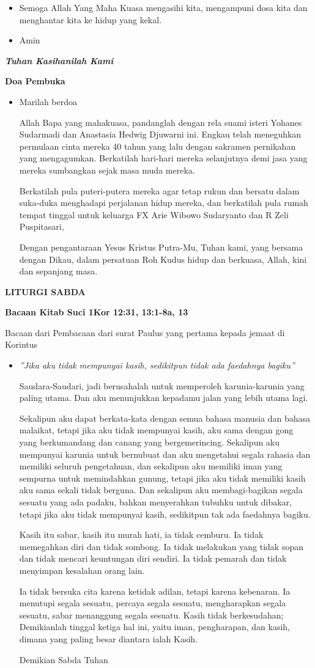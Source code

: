 \documentclass[12pt,twoside,anypage]{scrbook}
\makeatletter
\newcommand{\judul}[1]{%
  {\parindent \z@ \centering \normalfont
    \interlinepenalty\@M \large \bfseries #1\par\nobreak \vskip 20\p@ }}
\newcommand{\subjudul}[1]{%
  {\parindent \z@ \normalfont
    \interlinepenalty\@M \bfseries #1\par\nobreak \vskip 20\p@ }}
\newcommand{\lagu}[1]{%
  {\parindent \z@ \normalfont
    \interlinepenalty\@M \bfseries \emph{#1}\par\nobreak \vskip 20\p@ }}
\newcommand{\BU}[1]{\begin{itemize} \item[U:] #1 \end{itemize}}
\newcommand{\BI}[1]{\begin{itemize} \item[I:] #1 \end{itemize}}
\newcommand{\BP}[1]{\begin{itemize} \item[P:] #1 \end{itemize}}
\newcommand{\keluarga}{FX Arie Wibowo Sudaryanto dan R Zeli Puspitasari\xspace}
\newcommand{\ibu}{Anastasia Hedwig Djuwarni\xspace}
\newcommand{\bapak}{Yohanes Sudarmadi\xspace}
\makeatother
\begin{document}
\BI{Semoga Allah Yang Maha Kuasa mengasihi kita, mengampuni dosa kita dan menghantar kita ke hidup yang kekal.}

\BU{Amin}

\lagu{Tuhan Kasihanilah Kami}

\subjudul{Doa Pembuka}

\BI{Marilah berdoa

Allah Bapa yang mahakuasa, pandanglah dengan rela suami isteri \bapak
dan \ibu ini. Engkau telah meneguhkan permulaan cinta mereka 40 tahun yang lalu dengan sakramen pernikahan yang mengagumkan. Berkatilah hari-hari mereka selanjutnya demi jasa yang mereka sumbangkan sejak masa muda mereka. 

Berkatilah pula puteri-putera
mereka agar tetap rukun dan bersatu dalam
suka-duka menghadapi perjalanan hidup mereka,
dan berkatilah pula rumah tempat tinggal untuk keluarga \keluarga ,

Dengan pengantaraan Yesus Kristus Putra-Mu,
Tuhan kami,
yang bersama dengan Dikau,
dalam persatuan Roh Kudus
hidup dan berkuasa,
Allah, kini dan sepanjang masa.
}

\judul{LITURGI SABDA}

\subjudul{Bacaan Kitab Suci 1Kor 12:31, 13:1-8a, 13}

Bacaan dari Pembacaan dari surat Paulus yang pertama kepada
jemaat di Korintus

\BP{
\begin{center}\emph{
”Jika aku tidak mempunyai kasih, sedikitpun tidak ada
faedahnya bagiku”}
\end{center}
 
Saudara-Saudari, jadi berusahalah untuk memperoleh
karunia-karunia yang paling utama. Dan aku menunjukkan
kepadamu jalan yang lebih utama lagi.

Sekalipun aku dapat berkata-kata dengan semua
bahasa manusia dan bahasa malaikat, tetapi jika aku tidak
mempunyai kasih, aku sama dengan gong yang
berkumandang dan canang yang bergemerincing.
Sekalipun aku mempunyai karunia untuk bernubuat dan
aku mengetahui segala rahasia dan memiliki seluruh
pengetahuan, dan sekalipun aku memiliki iman yang
sempurna untuk memindahkan gunung, tetapi jika aku
tidak memiliki kasih aku sama sekali tidak berguna.
Dan sekalipun aku membagi-bagikan segala sesuatu
yang ada padaku, bahkan menyerahkan tubuhku untuk
dibakar, tetapi jika aku tidak mempunyai kasih, sedikitpun
tak ada faedahnya bagiku.

Kasih itu sabar, kasih itu murah hati, ia tidak cemburu.
Ia tidak memegahkan diri dan tidak sombong.
Ia tidak melakukan yang tidak sopan dan tidak mencari
keuntungan diri sendiri. Ia tidak pemarah dan tidak
menyimpan kesalahan orang lain.

Ia tidak bersuka cita karena ketidak adilan, tetapi
karena kebenaran.
Ia menutupi segala sesuatu, percaya segala sesuatu,
mengharapkan segala sesuatu, sabar menanggung segala
sesuatu. Kasih tidak berkesudahan;
Demikianlah tinggal ketiga hal ini, yaitu iman,
pengharapan, dan kasih, dimana yang paling besar
diantara ialah Kasih.

Demikian Sabda Tuhan}
\end{document}
